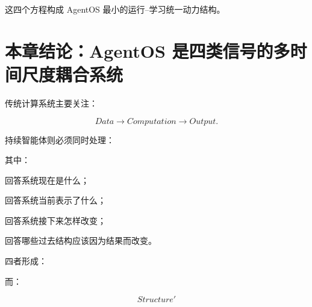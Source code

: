 这四个方程构成 AgentOS 最小的运行--学习统一动力结构。

\section{本章结论：AgentOS 是四类信号的多时间尺度耦合系统}

传统计算系统主要关注：

\[
Data
\rightarrow
Computation
\rightarrow
Output.
\]

持续智能体则必须同时处理：

\begin{statementbox}
\centering
{}
\end{statementbox}

其中：

\begin{statementbox}
\centering
{}
\end{statementbox}

回答系统现在是什么；

\begin{statementbox}
\centering
{}
\end{statementbox}

回答系统当前表示了什么；

\begin{statementbox}
\centering
{}
\end{statementbox}

回答系统接下来怎样改变；

\begin{statementbox}
\centering
{}
\end{statementbox}

回答哪些过去结构应该因为结果而改变。

四者形成：

\begin{statementbox}
\centering
{}
\end{statementbox}

而：

\[
Structure'
\]

